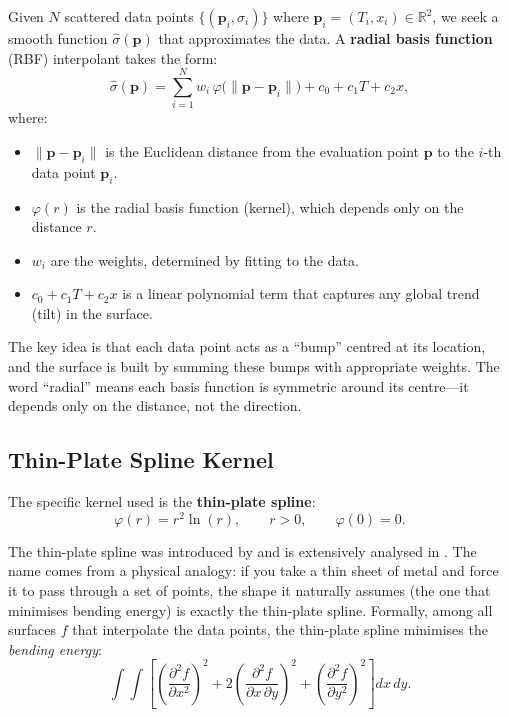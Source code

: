 \documentclass[12pt, a4paper]{article}
\begin{document}
Given $N$ scattered data points $\{(\mathbf{p}_i, \sigma_i)\}$ where
$\mathbf{p}_i = (T_i, x_i) \in \mathbb{R}^2$, we seek a smooth function
$\hat{\sigma}(\mathbf{p})$ that approximates the data. A \textbf{radial basis
function} (RBF) interpolant \parencite{buhmann2003radial} takes the form:
\begin{equation}
    \hat{\sigma}(\mathbf{p}) = \sum_{i=1}^{N} w_i \, \varphi\!\big(\|\mathbf{p} - \mathbf{p}_i\|\big) + c_0 + c_1 T + c_2 x,
    \label{eq:rbf}
\end{equation}
where:
\begin{itemize}[nosep]
    \item $\|\mathbf{p} - \mathbf{p}_i\|$ is the Euclidean distance from the
          evaluation point $\mathbf{p}$ to the $i$-th data point $\mathbf{p}_i$.
    \item $\varphi(r)$ is the radial basis function (kernel), which depends only
          on the distance $r$.
    \item $w_i$ are the weights, determined by fitting to the data.
    \item $c_0 + c_1 T + c_2 x$ is a linear polynomial term that captures any
          global trend (tilt) in the surface.
\end{itemize}

The key idea is that each data point acts as a ``bump'' centred at its location,
and the surface is built by summing these bumps with appropriate weights. The
word ``radial'' means each basis function is symmetric around its centre---it
depends only on the distance, not the direction.

\subsection{Thin-Plate Spline Kernel}
\label{sec:tps}

The specific kernel used is the \textbf{thin-plate spline}:
\begin{equation}
    \varphi(r) = r^2 \ln(r), \qquad r > 0, \qquad \varphi(0) = 0.
    \label{eq:tps_kernel}
\end{equation}

The thin-plate spline was introduced by \textcite{duchon1977splines} and is
extensively analysed in \textcite{wahba1990spline}. The name comes from a
physical analogy: if you take a thin sheet of metal and force it to pass through
a set of points, the shape it naturally assumes (the one that minimises bending
energy) is exactly the thin-plate spline. Formally, among all surfaces $f$ that
interpolate the data points, the thin-plate spline minimises the \emph{bending
energy}:
\begin{equation}
    \int\!\!\int \left[\left(\frac{\partial^2 f}{\partial x^2}\right)^{\!2}
    + 2\left(\frac{\partial^2 f}{\partial x\,\partial y}\right)^{\!2}
    + \left(\frac{\partial^2 f}{\partial y^2}\right)^{\!2}\right] dx\,dy.
    \label{eq:bending}
\end{equation}
\end{document}

